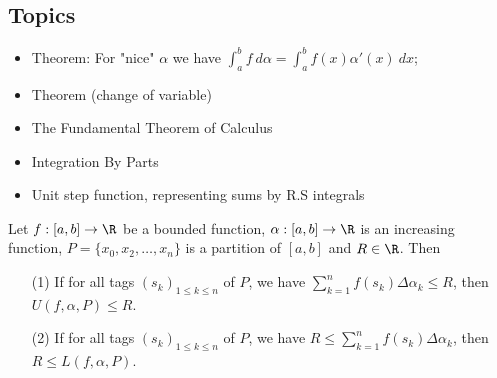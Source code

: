 \subsection{Topics}

\begin{itemize}
    \item Theorem: For "nice" \( \alpha \) we have \( \displaystyle \int_{ a }^{ b }  f  \ d \alpha  = \int_{ a }^{ b }  f(x) \alpha'(x) \ dx \);
    \item Theorem (change of variable)
    \item The Fundamental Theorem of Calculus
    \item Integration By Parts
    \item Unit step function, representing sums by R.S integrals
\end{itemize}

\begin{lemma}
    Let \( f: [a,b] \to \R  \) be a bounded function, \( \alpha: [a,b] \to \R  \) is an increasing function, \( P = \{ {x}_{0}, {x}_{2}, \dots, {x}_{n} \}  \) is a partition of \( [a,b] \) and \( R \in \R  \). Then  
    \begin{enumerate}
        \item[(1)] If for all tags \( ({s}_{k })_{1 \leq k \leq n }  \) of \( P  \), we have \( \sum_{ k=1  }^{ n } f({s}_{k}) \Delta {\alpha}_{k } \leq R  \), then \( U(f,\alpha,P) \leq R  \).
        \item[(2)] If for all tags \( ({s}_{k})_{1 \leq k \leq n } \) of \( P  \), we have \( R \leq \sum_{ k=1  }^{ n } f({s}_{k}) \Delta {\alpha}_{k } \), then \( R \leq L(f,\alpha, P) \).
    \end{enumerate}
\end{lemma}

